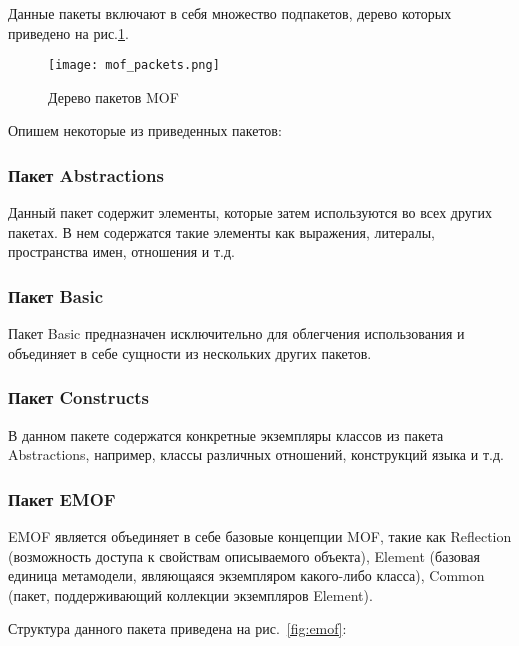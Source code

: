 Данные пакеты включают в себя множество подпакетов, дерево которых приведено
на рис.\ref{fig:mof_packets}.

\begin{figure}[ht]
    \begin{center}
        \texttt{[image: mof\_packets.png]}
    \end{center}
    \caption{Дерево пакетов MOF}
    \label{fig:mof_packets}
\end{figure}

Опишем некоторые из приведенных пакетов:

\subsubsection{Пакет Abstractions}

Данный пакет содержит элементы, которые затем используются во всех других
пакетах. В нем содержатся такие элементы как выражения, литералы,
пространства имен, отношения и т.д.

\subsubsection{Пакет Basic}

Пакет Basic предназначен исключительно для облегчения использования и объединяет
в себе сущности из нескольких других пакетов.

\subsubsection{Пакет Constructs}

В данном пакете содержатся конкретные экземпляры классов из пакета Abstractions,
например, классы различных отношений, конструкций языка и т.д.

\subsubsection{Пакет EMOF}


EMOF является объединяет в себе базовые концепции MOF, такие как Reflection
(возможность доступа к свойствам описываемого объекта), Element (базовая единица
метамодели, являющаяся экземпляром какого-либо класса), Common (пакет,
поддерживающий коллекции экземпляров Element).

Структура данного пакета приведена на рис.~\ref{fig:emof}:

